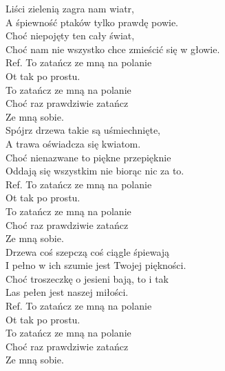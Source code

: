 
Liści zielenią zagra nam wiatr,  \tab{} \tab{} \\
A śpiewność ptaków tylko prawdę powie.  \tab{} \\
Choć niepojęty ten cały świat,  \tab{} \\
Choć nam nie wszystko chce zmieścić się w głowie.  \\
\hops
Ref. To zatańcz ze mną na polanie  \\
 Ot tak po prostu.  \tab{} \\
 To zatańcz ze mną na polanie   \\
 Choć raz prawdziwie zatańcz   \\
 Ze mną sobie.  \tab{}  \\
\hops
Spójrz drzewa takie są uśmiechnięte, \\
A trawa oświadcza się kwiatom. \\
Choć nienazwane to piękne przepięknie \\
Oddają się wszystkim nie biorąc nic za to. \\
\hops
Ref. To zatańcz ze mną na polanie\\
 Ot tak po prostu. \\
 To zatańcz ze mną na polanie \\
 Choć raz prawdziwie zatańcz \\
 Ze mną sobie. \\
\hops
Drzewa coś szepczą coś ciągle śpiewają \\
I pełno w ich szumie jest Twojej piękności. \\
Choć troszeczkę o jesieni bają, to i tak \\
Las pełen jest naszej miłości.  \\
\hops
Ref. To zatańcz ze mną na polanie\\
 Ot tak po prostu. \\
 To zatańcz ze mną na polanie \\
 Choć raz prawdziwie zatańcz \\
 Ze mną sobie.